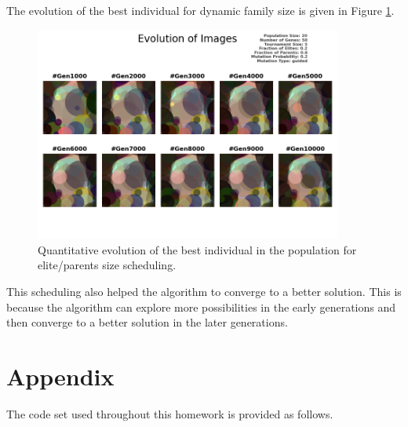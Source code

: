 \documentclass{assignment}
\begin{document}
The evolution of the best individual for dynamic family size is given in Figure \ref{fig:schedule_fit_image}.
\begin{figure}[!htb]
    \centering
    \includegraphics[width=0.9\textwidth]{figures/images_outputFRAC_20_50_5_0.2_0.6_0.2_guided.png}
    \caption{Quantitative evolution of the best individual in the population for elite/parents size scheduling.}
    \label{fig:schedule_fit_image}
\end{figure}

This scheduling also helped the algorithm to converge to a better solution. This is because the algorithm can explore more possibilities in the early generations and then converge to a better solution in the later generations.

\section*{Appendix}
The code set used throughout this homework is provided as follows. 






\nocite{*} 
\end{document}
